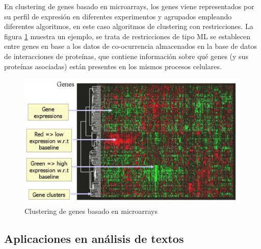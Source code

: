 En clustering de genes basado en microarrays, los genes viene representados por su perfil de expresión en diferentes experimentos y agrupados empleando diferentes algoritmos, en este caso algoritmos de clustering con restricciones. La  figura \ref{fig:figure13} muestra un ejemplo, se trata de restricciones de tipo \acf{ML} se establecen entre genes en base a los datos de co-ocurrencia almacenados en la base de datos de interacciones de proteínas, que contiene información sobre qué genes (y sus proteínas asociadas) están presentes en los mismos procesos celulares.

\begin{figure}[!h]
	\centering
	\includegraphics[scale=0.3]{imagenes/c3/Genetica/Genes} 
	\caption{Clustering de genes basado en microarrays \cite{Survey:2007}}\label{fig:figure13}
\end{figure}

\subsection{Aplicaciones en análisis de textos}





























